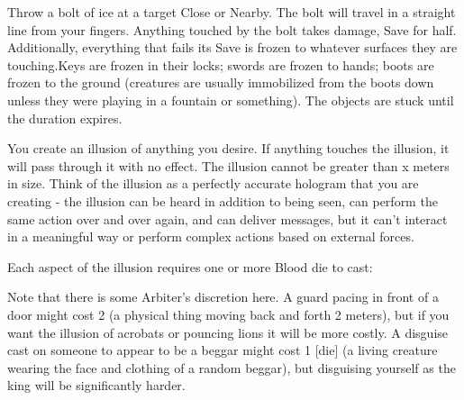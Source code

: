 {Throw a bolt of ice at a target Close or Nearby.  The bolt will travel in a
straight line from your fingers.  Anything touched by the bolt takes
\SUMDICE damage, Save for half.  Additionally, everything that fails its
Save is frozen to whatever surfaces they are touching.Keys are frozen in
their locks; swords are frozen to hands; boots are frozen to the ground
(creatures are usually immobilized from the boots down unless they were
playing in a fountain or something).  The objects are stuck until the
duration expires.  




\SPELL[
  Name=Illusion,
  Link=wizardry-illusion,
  Paradigm=Mind,
  Save=N,
  Duration=Varies,
  Counter=\mylink{Ego Weapon}{wizardry-ego-weapon} ,
  Keywords=None,
  Target=Varies
]



You create an illusion of anything you desire. If anything touches the
illusion, it will pass through it with no effect.  The illusion cannot be
greater than \DICE x \DICE meters in size.  Think of the illusion as a
perfectly accurate hologram that you are creating - the illusion can be
heard in addition to being seen, can perform the same action over and over
again, and can deliver messages, but it can't interact in a meaningful way
or perform complex actions based on external forces. 

Each aspect of the illusion requires one or more Blood die to cast:


Note that there is some Arbiter's discretion here.  A guard pacing in front
of a door might cost 2 \DICE (a physical thing moving back and forth 2
meters), but if you want the illusion of acrobats or pouncing lions it will
be more costly.  A disguise cast on someone to appear to be a beggar might
cost 1 [die] (a living creature wearing the face and clothing of a random
beggar), but disguising yourself as the king will be significantly harder.

}
